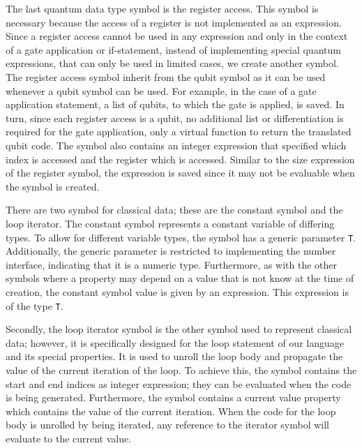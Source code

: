 The last quantum data type symbol is the register access. This symbol is necessary because the access of a register is not implemented as an expression. Since a register access cannot be used in any expression and only in the context of a gate application or if-statement, instead of implementing special quantum expressions, that can only be used in limited cases, we create another symbol. The register access symbol inherit from the qubit symbol as it can be used whenever a qubit symbol can be used. For example, in the case of a gate application statement, a list of qubits, to which the gate is applied, is saved. In turn, since each register access is a qubit, no additional list or differentiation is required for the gate application, only a virtual function to return the translated qubit code. The symbol also contains an integer expression that specified which index is accessed and the register which is accessed. Similar to the size expression of the register symbol, the expression is saved since it may not be evaluable when the symbol is created.

There are two symbol for classical data; these are the constant symbol and the loop iterator. The constant symbol represents a constant variable of differing types. To allow for different variable types, the symbol has a generic parameter \texttt{T}. Additionally, the generic parameter is restricted to implementing the number interface, indicating that it is a numeric type. Furthermore, as with the other symbols where a property may depend on a value that is not know at the time of creation, the constant symbol value is given by an expression. This expression is of the type \texttt{T}.

Secondly, the loop iterator symbol is the other symbol used to represent classical data; however, it is specifically designed for the loop statement of our language and its special properties. It is used to unroll the loop body and propagate the value of the current iteration of the loop. To achieve this, the symbol contains the start and end indices as integer expression; they can be evaluated when the code is being generated. Furthermore, the symbol contains a current value property which contains the value of the current iteration. When the code for the loop body is unrolled by being iterated, any reference to the iterator symbol will evaluate to the current value.  

